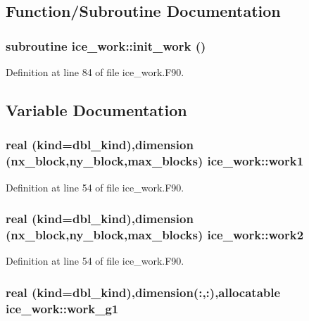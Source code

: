 \subsection{Function/Subroutine Documentation}
\hypertarget{namespaceice__work_af0fa69c909e63b58400ba8f31ab81a4b}{
\subsubsection[{init\_\-work}]{\setlength{\rightskip}{0pt plus 5cm}subroutine ice\_\-work::init\_\-work ()}}
\label{namespaceice__work_af0fa69c909e63b58400ba8f31ab81a4b}


Definition at line 84 of file ice\_\-work.F90.

\subsection{Variable Documentation}
\hypertarget{namespaceice__work_a5099225ca0b3af312ef912afa606cbce}{
\subsubsection[{work1}]{\setlength{\rightskip}{0pt plus 5cm}real (kind=dbl\_\-kind),dimension (nx\_\-block,ny\_\-block,max\_\-blocks) {\bf ice\_\-work::work1}}}
\label{namespaceice__work_a5099225ca0b3af312ef912afa606cbce}


Definition at line 54 of file ice\_\-work.F90.\hypertarget{namespaceice__work_af68c18020956e2cb0b298ccb87d24ece}{
\subsubsection[{work2}]{\setlength{\rightskip}{0pt plus 5cm}real (kind=dbl\_\-kind),dimension (nx\_\-block,ny\_\-block,max\_\-blocks) {\bf ice\_\-work::work2}}}
\label{namespaceice__work_af68c18020956e2cb0b298ccb87d24ece}


Definition at line 54 of file ice\_\-work.F90.\hypertarget{namespaceice__work_a6feb68d353a0240588d528748fecab4c}{
\subsubsection[{work\_\-g1}]{\setlength{\rightskip}{0pt plus 5cm}real (kind=dbl\_\-kind),dimension(:,:),allocatable {\bf ice\_\-work::work\_\-g1}}}
\label{namespaceice__work_a6feb68d353a0240588d528748fecab4c}


